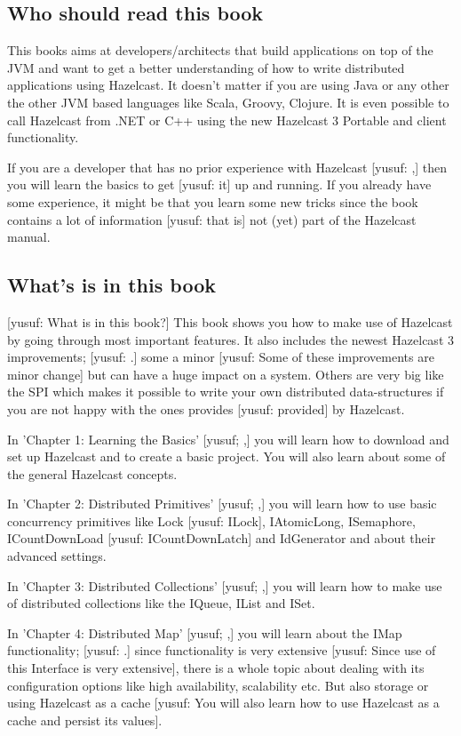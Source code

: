 \subsection*{Who should read this book}
This books aims at developers/architects that build applications on top of the JVM and want to get a better understanding of how to write distributed applications using Hazelcast. It doesn't matter if you are using Java or any other the other JVM based languages like Scala, Groovy, Clojure. It is even possible to call Hazelcast from .NET or C++ using the new Hazelcast 3 Portable and client functionality.

If you are a developer that has no prior experience with Hazelcast [yusuf: ,] then you will learn the basics to get [yusuf: it] up and running. If you already have some experience, it might be that you learn some new tricks since the book contains a lot of information [yusuf: that is] not (yet) part of the Hazelcast manual.
 
\subsection*{What's is in this book} [yusuf: What is in this book?]
This book shows you how to make use of Hazelcast by going through most important features. It also includes the newest Hazelcast 3 improvements; [yusuf: .] some a minor [yusuf: Some of these improvements are minor change] but can have a huge impact on a system. Others are very big like the SPI which makes it possible to write your own distributed data-structures if you are not happy with the ones provides [yusuf: provided] by Hazelcast.

In 'Chapter 1: Learning the Basics' [yusuf; ,] you will learn how to download and set up Hazelcast and to create a basic project. You will also learn about some of the general Hazelcast concepts.

In 'Chapter 2: Distributed Primitives' [yusuf; ,] you will learn how to use basic concurrency primitives like Lock [yusuf: ILock], IAtomicLong, ISemaphore, ICountDownLoad [yusuf: ICountDownLatch] and IdGenerator and about their advanced settings.

In 'Chapter 3: Distributed Collections' [yusuf; ,] you will learn how to make use of distributed collections like the IQueue, IList and ISet.

In 'Chapter 4: Distributed Map' [yusuf; ,] you will learn about the IMap functionality; [yusuf: .] since functionality is very extensive [yusuf: Since use of this Interface is very extensive], there is a whole topic about dealing with its configuration options like high availability, scalability etc. But also storage or using Hazelcast as a cache [yusuf: You will also learn how to use Hazelcast as a cache and persist its values].

